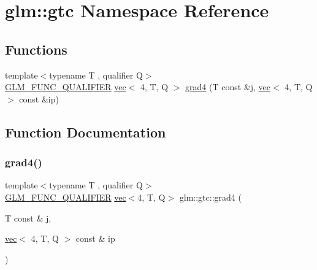 \hypertarget{namespaceglm_1_1gtc}{}\section{glm\+:\+:gtc Namespace Reference}
\label{namespaceglm_1_1gtc}
\subsection*{Functions}
\begin{DoxyCompactItemize}
\item 
{\footnotesize template$<$typename T , qualifier Q$>$ }\\\hyperlink{setup_8hpp_a33fdea6f91c5f834105f7415e2a64407}{G\+L\+M\+\_\+\+F\+U\+N\+C\+\_\+\+Q\+U\+A\+L\+I\+F\+I\+ER} \hyperlink{structglm_1_1vec}{vec}$<$ 4, T, Q $>$ \hyperlink{namespaceglm_1_1gtc_a3e64854dc3369fadffdc335c55a90fd5}{grad4} (T const \&j, \hyperlink{structglm_1_1vec}{vec}$<$ 4, T, Q $>$ const \&ip)
\end{DoxyCompactItemize}


\subsection{Function Documentation}
\mbox{\label{namespaceglm_1_1gtc_a3e64854dc3369fadffdc335c55a90fd5}} 
\subsubsection{\texorpdfstring{grad4()}{grad4()}}
{\footnotesize\ttfamily template$<$typename T , qualifier Q$>$ \\
\hyperlink{setup_8hpp_a33fdea6f91c5f834105f7415e2a64407}{G\+L\+M\+\_\+\+F\+U\+N\+C\+\_\+\+Q\+U\+A\+L\+I\+F\+I\+ER} \hyperlink{structglm_1_1vec}{vec}$<$4, T, Q$>$ glm\+::gtc\+::grad4 (\begin{DoxyParamCaption}\item[{T const \&}]{j,  }\item[{\hyperlink{structglm_1_1vec}{vec}$<$ 4, T, Q $>$ const \&}]{ip }\end{DoxyParamCaption})}

